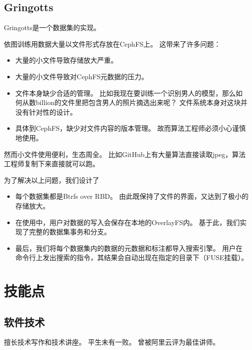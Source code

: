 \documentclass[scheme=plain]{ctexart}
\begin{document}
\subsection*{Gringotts}

Gringotts是一个数据集的实现。

依图训练用数据大量以文件形式存放在CephFS上。
这带来了许多问题：
\begin{itemize}
    \item 大量的小文件导致存储放大严重。
    \item 大量的小文件导致对CephFS元数据的压力。
    \item 文件本身缺少合适的管理。
        比如我现在要训练一个识别男人的模型，那么如何从数billion的文件里把包含男人的照片摘选出来呢？
        文件系统本身对这块并没有针对性的设计。
    \item 具体到CephFS，缺少对文件内容的版本管理。
        故而算法工程师必须小心谨慎地使用。
\end{itemize}
然而小文件使用便利，生态周全。
比如GitHub上有大量算法直接读取jpeg，算法工程师复制下来直接就可以跑。

为了解决以上问题，我们设计了
\begin{itemize}
    \item 每个数据集都是Btrfs over RBD。
        由此既保持了文件的界面，又达到了极小的存储放大。
    \item 在使用中，用户对数据的写入会保存在本地的OverlayFS内。
        基于此，我们实现了完整的数据集事务和分支。
    \item 最后，我们将每个数据集内的数据的元数据和标注都导入搜索引擎。
        用户在命令行上发出搜索的指令，其结果会自动出现在指定的目录下（FUSE挂载）。
\end{itemize}

\section{技能点}

\subsection{软件技术}

擅长技术写作和技术讲座。
平生未有一败。
曾被阿里云评为最佳讲师。
\end{document}
